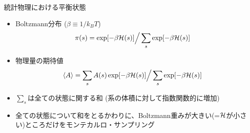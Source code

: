 \begin{frame}[t,fragile]{統計物理における平衡状態}
  \begin{itemize}
    \setlength{\itemsep}{1em}
  \item Boltzmann分布 ($\beta \equiv 1/k_B T$)
    \[
    \pi(s) = \exp[-\beta {\cal H}(s)] \Big / \sum_s \exp[-\beta {\cal H}(s)]
    \]
  \item 物理量の期待値
    \[
    \langle A \rangle = \sum_s A(s) \exp[-\beta {\cal H}(s)] \Big/ \sum_s \exp[-\beta {\cal H}(s)]
    \]
  \item $\sum_s$は全ての状態に関する和 (系の体積に対して指数関数的に増加)
  \item 全ての状態について和をとるかわりに、Boltzmann重みが大きい(=$\cal H$が小さい)ところだけをモンテカルロ・サンプリング
  \end{itemize}
\end{frame}
